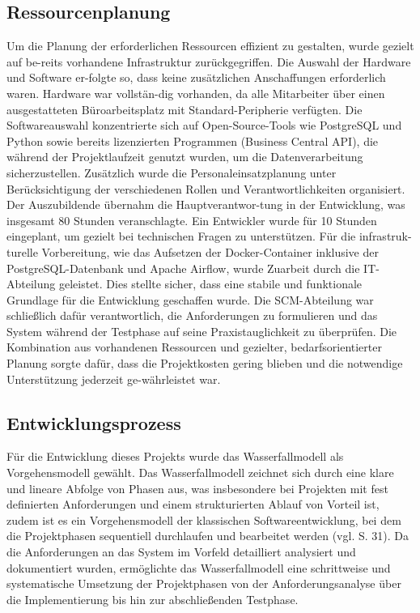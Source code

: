 \subsection{Ressourcenplanung}
\label{sec:Ressourcenplanung}
Um die Planung der erforderlichen Ressourcen effizient zu gestalten, wurde gezielt auf be-reits vorhandene Infrastruktur zurückgegriffen. Die Auswahl der Hardware und Software er-folgte so, dass keine zusätzlichen Anschaffungen erforderlich waren. Hardware war vollstän-dig vorhanden, da alle Mitarbeiter über einen ausgestatteten Büroarbeitsplatz mit Standard-Peripherie verfügten. Die Softwareauswahl konzentrierte sich auf Open-Source-Tools wie PostgreSQL und Python sowie bereits lizenzierten Programmen (Business Central API), die während der Projektlaufzeit genutzt wurden, um die Datenverarbeitung sicherzustellen.
Zusätzlich wurde die Personaleinsatzplanung unter Berücksichtigung der verschiedenen Rollen und Verantwortlichkeiten organisiert. Der Auszubildende übernahm die Hauptverantwor-tung in der Entwicklung, was insgesamt 80 Stunden veranschlagte. Ein Entwickler wurde für 10 Stunden eingeplant, um gezielt bei technischen Fragen zu unterstützen. Für die infrastruk-turelle Vorbereitung, wie das Aufsetzen der Docker-Container inklusive der PostgreSQL-Datenbank und Apache Airflow, wurde Zuarbeit durch die IT-Abteilung geleistet. Dies stellte sicher, dass eine stabile und funktionale Grundlage für die Entwicklung geschaffen wurde.
Die SCM-Abteilung war schließlich dafür verantwortlich, die Anforderungen zu formulieren und das System während der Testphase auf seine Praxistauglichkeit zu überprüfen. Die Kombination aus vorhandenen Ressourcen und gezielter, bedarfsorientierter Planung sorgte dafür, dass die Projektkosten gering blieben und die notwendige Unterstützung jederzeit ge-währleistet war.


\subsection{Entwicklungsprozess}
\label{sec:Entwicklungsprozess}
Für die Entwicklung dieses Projekts wurde das Wasserfallmodell als Vorgehensmodell gewählt. 
Das Wasserfallmodell zeichnet sich durch eine klare und lineare Abfolge von Phasen aus, was insbesondere bei Projekten mit fest 
definierten Anforderungen und einem strukturierten Ablauf von Vorteil ist, zudem ist es ein Vorgehensmodell der klassischen Softwareentwicklung, bei dem die Projektphasen sequentiell 
durchlaufen und bearbeitet werden (vgl. \cite{FittkauRuf2008} S. 31). 
Da die Anforderungen an das System im Vorfeld detailliert analysiert und dokumentiert wurden, ermöglichte das Wasserfallmodell 
eine schrittweise und systematische Umsetzung der Projektphasen von der Anforderungsanalyse über die Implementierung bis hin zur abschließenden Testphase.


